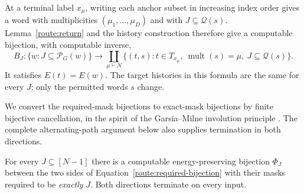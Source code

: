 At a terminal label $x_\mu$, writing each anchor subset in increasing
index order gives a word with multiplicities
$(\mu_1,\ldots,\mu_D)$ and with $J\subseteq\mathcal Q(s)$.
Lemma~\ref{route:return} and the history construction therefore give
a computable bijection, with computable inverse,
\begin{equation}
 \label{route:required-bijection}
 B_J:\{w:J\subseteq\mathcal P_G(w)\}
 \longrightarrow
 \coprod_{\mu\vdash N}
 \{(t,s):t\in T_{x_\mu},\
       \operatorname{mult}(s)=\mu,\ J\subseteq\mathcal Q(s)\}.
\end{equation}
It satisfies $E(t)=E(w)$.  The target histories in this formula are
the same for every $J$; only the permitted words $s$ change.

We convert the required-mask bijections to exact-mask bijections by
finite bijective cancellation, in the spirit of the Garsia--Milne
involution principle \cite{GM81}.  The complete alternating-path
argument below also supplies termination in both directions.

\begin{lemma}
\label{route:exact}
For every $J\subseteq[N-1]$ there is a computable energy-preserving
bijection $\Phi_J$ between the two sides of
Equation~\eqref{route:required-bijection} with their masks required to be
\emph{exactly} $J$.  Both directions terminate on every input.
\end{lemma}

